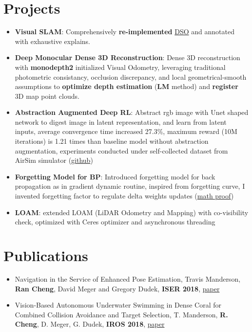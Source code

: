 \documentclass[letterpaper,10pt]{article}
\newcommand{\resumeItem}[2]{
  \item\small{
    \textbf{#1}{: #2 \vspace{-2pt}}
  }
}
\newcommand{\resumeSubItem}[2]{\resumeItem{#1}{#2}\vspace{-4pt}}
\newcommand{\resumeSubHeadingListStart}{\begin{itemize}[leftmargin=*]}
\newcommand{\resumeSubHeadingListEnd}{\end{itemize}}
\newcommand{\shorterSection}[1]{\vspace{-10pt}\section{#1}}
\begin{document}
\shorterSection{\textcolor{titleblue}{Projects}}
  \resumeSubHeadingListStart
    \resumeSubItem{Visual SLAM}
     {
     Comprehensively \textbf{re-implemented} \href{https://github.com/rancheng/dso_understands}{\textcolor{linkblue}{DSO}} and annotated with exhaustive explains.
     }
    \resumeSubItem{Deep Monocular Dense 3D Reconstruction}{Dense 3D reconstruction with \textbf{monodepth2} initialized Visual Odometry, leveraging traditional photometric consistancy, occlusion discrepancy, and local geometrical-smooth assumptions to \textbf{optimize depth estimation} (\textbf{LM} method) and \textbf{register} 3D map point clouds.}
    \resumeSubItem{Abstraction Augmented Deep RL}
      {Abstract rgb image with Unet shaped network to digest image in latent representation, and learn from latent inputs, average convergence time increased 27.3\%, maximum reward (10M iterations) is 1.21 times than baseline model without abstraction augmentation, experiments conducted under self-collected dataset from AirSim simulator (\href{https://github.com/rancheng/AirSimProjects}{\textcolor{linkblue}{github}})}
    \resumeSubItem{Forgetting Model for BP}
      {Introduced forgetting model for back propagation as in gradient dynamic routine, inspired from forgetting curve, I invented forgetting factor to regulate delta weights updates (\href{https://rancheng.github.io/forgetting-model/}{\textcolor{linkblue}{math proof}})}
    \resumeSubItem{LOAM}{extended LOAM (LiDAR Odometry and Mapping) with co-visibility check, optimized with Ceres optimizer and asynchronous threading}
  \resumeSubHeadingListEnd

\shorterSection{\textcolor{titleblue}{Publications}}
  \resumeSubHeadingListStart
  \small
        \item{Navigation in the Service of Enhanced Pose Estimation, Travis Manderson, \textbf{Ran Cheng}, David Meger and Gregory Dudek, \textbf{ISER 2018}, \href{http://www.cim.mcgill.ca/~travism/authors/ran-cheng/}{\textcolor{linkblue}{paper}}}
        \vspace{-5pt}
        \item{Vision-Based Autonomous Underwater Swimming in Dense Coral for Combined Collision Avoidance and Target Selection, T. Manderson, \textbf{R. Cheng}, D. Meger, G. Dudek, \textbf{IROS 2018}, \href{http://www.cim.mcgill.ca/~travism/authors/ran-cheng/}{\textcolor{linkblue}{paper}}}
  \resumeSubHeadingListEnd
\end{document}
